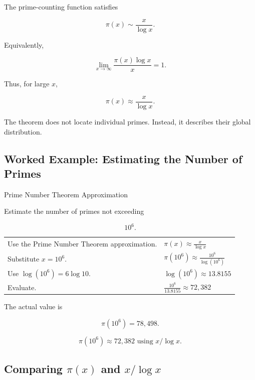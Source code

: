\begin{theorem}
The prime-counting function satisfies

\[ \boxed{\pi(x)\sim\frac{x}{\log x}.} \]

Equivalently,

\[ \boxed{\lim_{x\to\infty}\frac{\pi(x)\log x}{x}=1.} \]
\end{theorem}

Thus, for large \(x\),

\[ \pi(x)\approx\frac{x}{\log x}. \]

The theorem does not locate individual primes. Instead, it describes their
global distribution.

\subsection{Worked Example: Estimating the Number of Primes}
\label{subsec:worked-prime-estimate}

\begin{workedexamplebox}{Prime Number Theorem Approximation}

Estimate the number of primes not exceeding

\[ 10^6. \]

\begin{tabularx}{\textwidth}{@{}>{\raggedright\arraybackslash}p{}X@{}}
Use the Prime Number Theorem approximation. &
\(\displaystyle \pi(x)\approx\frac{x}{\log x}\)\\
Substitute \(x=10^6\). &
\(\displaystyle \pi(10^6)\approx\frac{10^6}{\log(10^6)}\)\\
Use \(\log(10^6)=6\log10\). &
\(\displaystyle \log(10^6)\approx13.8155\)\\
Evaluate. &
\(\displaystyle \frac{10^6}{13.8155}\approx72{,}382\)
\end{tabularx}

The actual value is

\[ \pi(10^6)=78{,}498. \]

\begin{answerbox}
\[ \boxed{\pi(10^6)\approx72{,}382\text{ using }x/\log x.} \]
\end{answerbox}
\end{workedexamplebox}

\subsection{Comparing \(\pi(x)\) and \(x/\log x\)}
\label{subsec:prime-counting-comparison}

